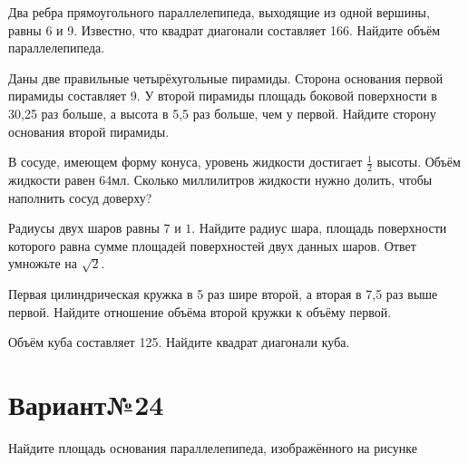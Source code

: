 \documentclass[4apaper]{article}
\begin{document}
\begin{taskBN}{1}
Два ребра прямоугольного параллелепипеда, выходящие из одной вершины, равны 6 и 9. Известно, что квадрат диагонали составляет 166. Найдите объём параллелепипеда.
\end{taskBN}

\begin{taskBN}{2}
Даны две правильные четырёхугольные пирамиды. Сторона основания первой пирамиды составляет 9. У второй пирамиды площадь боковой поверхности в 30,25 раз больше, а высота в 5,5 раз больше, чем у первой. Найдите сторону основания второй пирамиды.
\end{taskBN}

\begin{taskBN}{3}
В сосуде, имеющем форму конуса, уровень жидкости достигает $\frac{1}{2}$ высоты. Объём жидкости равен 64мл. Сколько миллилитров жидкости нужно долить, чтобы наполнить сосуд доверху?
\end{taskBN}

\begin{taskBN}{4}
Радиусы двух шаров равны $7$ и $1$. Найдите радиус шара, площадь поверхности которого равна сумме площадей поверхностей двух данных шаров. Ответ умножьте на $\sqrt{2}$.
\end{taskBN}

\begin{taskBN}{5}
 Первая цилиндрическая кружка в 5 раз шире второй, а вторая в 7,5 раз выше первой. Найдите отношение объёма второй кружки к объёму первой.
\end{taskBN}

\begin{taskBN}{6}
Объём куба составляет 125. Найдите квадрат диагонали куба.
\end{taskBN}
\newpage\section*{Вариант№24}

\begin{taskBN}{1}
Найдите площадь основания параллелепипеда, изображённого на рисунке
\end{taskBN}
\vspace*{1cm}
\end{document}
